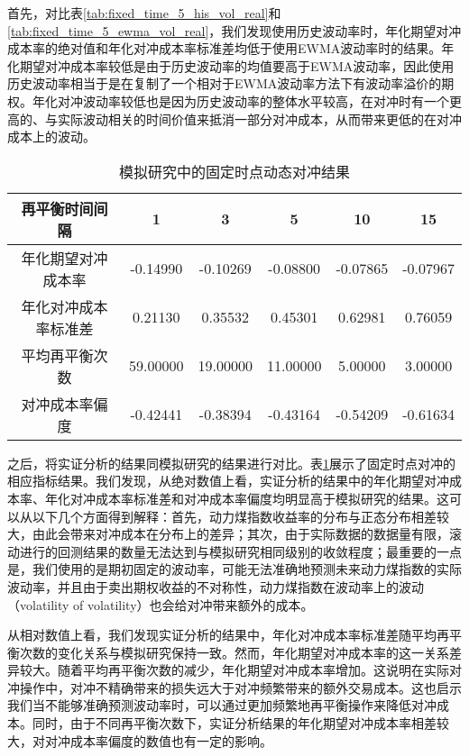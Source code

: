 首先，对比表\ref{tab:fixed_time_5_his_vol_real}和\ref{tab:fixed_time_5_ewma_vol_real}，我们发现使用历史波动率时，年化期望对冲成本率的绝对值和年化对冲成本率标准差均低于使用EWMA波动率时的结果。年化期望对冲成本率较低是由于历史波动率的均值要高于EWMA波动率，因此使用历史波动率相当于是在复制了一个相对于EWMA波动率方法下有波动率溢价的期权。年化对冲波动率较低也是因为历史波动率的整体水平较高，在对冲时有一个更高的、与实际波动相关的时间价值来抵消一部分对冲成本，从而带来更低的在对冲成本上的波动。

\begin{table}[htbp]
  \centering
  \caption{模拟研究中的固定时点动态对冲结果}
  \label{tab:fixed_time_5_sim}
  \begin{tabular}{cccccc}
    \toprule
    再平衡时间间隔 & 1 & 3 & 5 & 10 & 15 \\
    \midrule
    年化期望对冲成本率 & -0.14990 & -0.10269 & -0.08800 & -0.07865 & -0.07967 \\
    年化对冲成本率标准差 & 0.21130 & 0.35532 & 0.45301 & 0.62981 & 0.76059 \\
    平均再平衡次数 & 59.00000 & 19.00000 & 11.00000 & 5.00000 & 3.00000 \\
    对冲成本率偏度 & -0.42441 & -0.38394 & -0.43164 & -0.54209 & -0.61634 \\
    \bottomrule
  \end{tabular}
\end{table}

之后，将实证分析的结果同模拟研究的结果进行对比。表\ref{tab:fixed_time_5_sim}展示了固定时点对冲的相应指标结果。我们发现，从绝对数值上看，实证分析的结果中的年化期望对冲成本率、年化对冲成本率标准差和对冲成本率偏度均明显高于模拟研究的结果。这可以从以下几个方面得到解释：首先，动力煤指数收益率的分布与正态分布相差较大，由此会带来对冲成本在分布上的差异；其次，由于实际数据的数据量有限，滚动进行的回测结果的数量无法达到与模拟研究相同级别的收敛程度；最重要的一点是，我们使用的是期初固定的波动率，可能无法准确地预测未来动力煤指数的实际波动率，并且由于卖出期权收益的不对称性，动力煤指数在波动率上的波动（volatility of volatility）也会给对冲带来额外的成本。

从相对数值上看，我们发现实证分析的结果中，年化对冲成本率标准差随平均再平衡次数的变化关系与模拟研究保持一致。然而，年化期望对冲成本率的这一关系差异较大。随着平均再平衡次数的减少，年化期望对冲成本率增加。这说明在实际对冲操作中，对冲不精确带来的损失远大于对冲频繁带来的额外交易成本。这也启示我们当不能够准确预测波动率时，可以通过更加频繁地再平衡操作来降低对冲成本。同时，由于不同再平衡次数下，实证分析结果的年化期望对冲成本率相差较大，对对冲成本率偏度的数值也有一定的影响。

